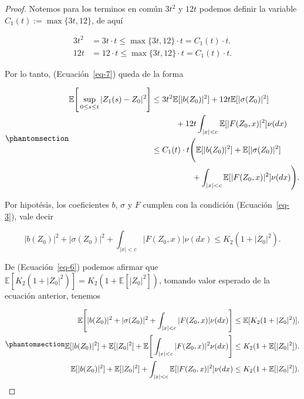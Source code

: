 \documentclass[
  spanish,
  us-letterpaper,
]{scrreprt}
\theoremstyle{plain}
\theoremstyle{plain}
\theoremstyle{plain}
\theoremstyle{definition}
\theoremstyle{remark}
\begin{document}
\begin{proof}
Notemos para los terminos en común \(3t^2\) y \(12t\) podemos definir la
variable \(C_1(t):=\max{\{3t,12\}}\), de aquí

\[
    \begin{aligned}
        3t^2 & = 3t\cdot t \leq \max{\{3t,12\}}\cdot t = C_1(t)\cdot t.\\ 
        12t & = 12\cdot t \leq \max{\{3t,12\}}\cdot t = C_1(t)\cdot t.
    \end{aligned}
\]

Por lo tanto, (Ecuación~\ref{eq-7}) queda de la forma

\begin{equation}\phantomsection\label{eq-8}{
    \begin{aligned}
        \mathbb{E}\Bigg[\sup\limits_{0\leq s\leq t}|Z_1(s)-Z_0|^2\Bigg] 
        & \leq 3t^2\mathbb{E}[|b(Z_0)|^2]+12t\mathbb{E}[|\sigma(Z_0)|^2]\\ 
        & \qquad\quad +12t\int_{|x|<c}\mathbb{E}[|F(Z_0,x)|^2]\nu(dx)\\ 
        & \leq C_1(t)\cdot t\Bigg(\mathbb{E}[|b(Z_0)|^2]+\mathbb{E}[|\sigma(Z_0)|^2]\\ 
        & \qquad \qquad\quad+\int_{|x|<c}\mathbb{E}[|F(Z_0,x)|^2]\nu(dx)\Bigg).
    \end{aligned}
}\end{equation}

Por hipotésis, los coeficientes \(b\), \(\sigma\) y \(F\) cumplen con la
condición (Ecuación~\ref{eq-3}), vale decir

\[
    |b(Z_0)|^2+|\sigma(Z_0)|^2+\int_{|x|<c}|F(Z_0,x)|\nu(dx)\leq K_2(1+|Z_0|^2).
\]

De (Ecuación~\ref{eq-6}) podemos afirmar que
\(\mathbb{E}[K_2(1+|Z_0|^2)]=K_2(1+\mathbb{E}[|Z_0|^2])\), tomando valor
esperado de la ecuación anterior, tenemos

\begin{equation}\phantomsection\label{eq-9}{
    \begin{aligned}
        \mathbb{E}\Bigg[|b(Z_0)|^2+|\sigma(Z_0)|^2+\int_{|x|<c}|F(Z_0,x)|\nu(dx)\Bigg] & \leq \mathbb{E}[K_2(1+|Z_0|^2)].\\
        \mathbb{E}[|b(Z_0)|^2]+\mathbb{E}[|Z_0|^2]+\mathbb{E}\Bigg[\int_{|x|<c}|F(Z_0,x)|^2\nu(dx)\Bigg] & \leq K_2(1+\mathbb{E}[|Z_0|^2]).\\ 
        \mathbb{E}[|b(Z_0)|^2]+\mathbb{E}[|Z_0|^2]+\int_{|x|<c}\mathbb{E}[|F(Z_0,x)|^2]\nu(dx)& \leq K_2(1+\mathbb{E}[|Z_0|^2]).    
    \end{aligned}
}\end{equation}


\end{proof}
\end{document}
